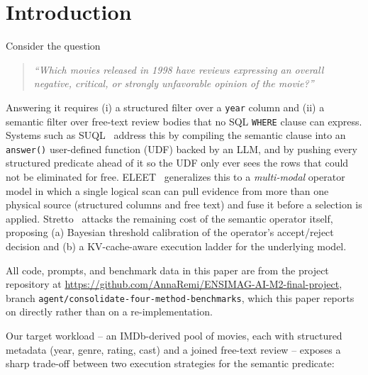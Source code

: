 \documentclass[sigconf,natbib=false]{acmart}
\begin{document}

\maketitle
\thispagestyle{firstpagestyle}

\section{Introduction}
\label{sec:intro}

Consider the question
\begin{quote}
\emph{``Which movies released in 1998 have reviews expressing an overall negative, critical, or strongly unfavorable opinion of the movie?''}
\end{quote}
Answering it requires (i) a structured filter over a \texttt{year} column and (ii) a semantic filter over free-text review bodies that no SQL \texttt{WHERE} clause can express. Systems such as SUQL~\cite{suql} address this by compiling the semantic clause into an \texttt{answer()} user-defined function (UDF) backed by an LLM, and by pushing every structured predicate ahead of it so the UDF only ever sees the rows that could not be eliminated for free. ELEET~\cite{eleet} generalizes this to a \emph{multi-modal} operator model in which a single logical scan can pull evidence from more than one physical source (structured columns and free text) and fuse it before a selection is applied. Stretto~\cite{stretto} attacks the remaining cost of the semantic operator itself, proposing (a) Bayesian threshold calibration of the operator's accept/reject decision and (b) a KV-cache-aware execution ladder for the underlying model.

All code, prompts, and benchmark data in this paper are from the project repository at \url{https://github.com/AnnaRemi/ENSIMAG-AI-M2-final-project}, branch \texttt{agent/consolidate-four-method-benchmarks}, which this paper reports on directly rather than on a re-implementation.

Our target workload -- an IMDb-derived pool of movies, each with structured metadata (year, genre, rating, cast) and a joined free-text review -- exposes a sharp trade-off between two execution strategies for the semantic predicate:
\end{document}
